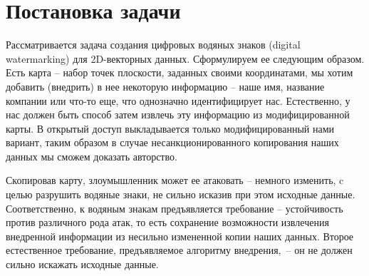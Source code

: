 \documentclass{article}
\begin{document}
\section{Постановка задачи}
Рассматривается задача создания цифровых водяных знаков (digital watermarking) для 2D-векторных данных. Сформулируем ее следующим образом. Есть карта -- набор точек плоскости, заданных своими координатами, мы хотим добавить (внедрить) в нее некоторую информацию -- наше имя, название компании или что-то еще, что однозначно идентифицирует нас.
Естественно, у нас должен быть способ затем извлечь эту информацию из модифицированной карты.
В открытый доступ выкладывается только модифицированный нами вариант, таким образом в случае несанкционированного копирования наших данных мы сможем доказать авторство. 

Скопировав карту, злоумышленник может ее атаковать -- немного изменить, c целью разрушить водяные знаки, не сильно исказив при этом исходные данные. Соответственно, к водяным знакам предъявляется требование -- устойчивость против различного рода атак, то есть сохранение возможности извлечения внедренной информации из несильно измененной копии наших данных. 
Второе естественное требование, предъявляемое алгоритму внедрения,~-- он не должен сильно искажать исходные данные.
\end{document}
